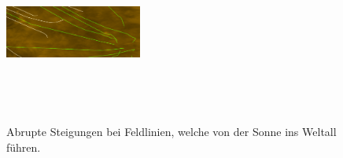 \begin{figure}[!htbp]
\center
\includegraphics[width=0.4\textwidth,height=6cm,keepaspectratio]{./pictures/resultate/loesung1/ringing/haar-like.png}
	\caption{Abrupte Steigungen bei Feldlinien, welche von der Sonne ins Weltall führen.}
	\label{resultate:loesung1:dct:randbehandlung:harte_richtungswechsel}
\end{figure}

